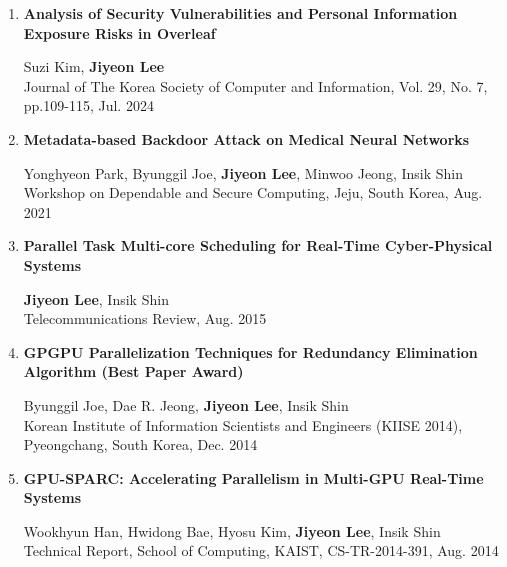 \documentclass[11pt,letterpaper]{article}
\begin{document}
\begin{enumerate}

	\item \textbf{Analysis of Security Vulnerabilities and Personal Information Exposure Risks in Overleaf} \\
	\begin{small}
		Suzi Kim, \textbf{Jiyeon Lee}\\ 
		Journal of The Korea Society of Computer and Information, Vol. 29, No. 7, pp.109-115, Jul. 2024
	\end{small}

	\item \textbf{Metadata-based Backdoor Attack on Medical Neural Networks} \\
	\begin{small}
		Yonghyeon Park, Byunggil Joe, \textbf{Jiyeon Lee}, Minwoo Jeong, Insik Shin\\ 
		Workshop on Dependable and Secure Computing, Jeju, South Korea, Aug. 2021
	\end{small}

	\item \textbf{Parallel Task Multi-core Scheduling for Real-Time Cyber-Physical Systems} \\
	\begin{small}
		\textbf{Jiyeon Lee}, Insik Shin\\ 
		Telecommunications Review, Aug. 2015
	\end{small}
	
	\item \textbf{GPGPU Parallelization Techniques for Redundancy Elimination Algorithm (Best Paper Award)} \\
	\begin{small}
		Byunggil Joe, Dae R. Jeong, \textbf{Jiyeon Lee}, Insik Shin\\ 
		Korean Institute of Information Scientists and Engineers (KIISE 2014), Pyeongchang, South Korea, Dec. 2014
	\end{small}

	\item \textbf{GPU-SPARC: Accelerating Parallelism in Multi-GPU Real-Time Systems} \\
	\begin{small}
		Wookhyun Han, Hwidong Bae, Hyosu Kim, \textbf{Jiyeon Lee}, Insik Shin\\ 
		Technical Report, School of Computing, KAIST, CS-TR-2014-391, Aug. 2014
	\end{small}
	

\end{enumerate}
\end{document}
